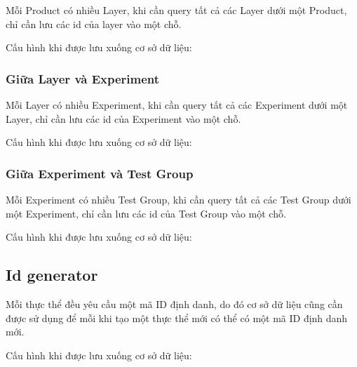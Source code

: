 Mỗi Product có nhiều Layer, khi cần query tất cả các Layer dưới một Product, chỉ cần lưu
các id của layer vào một chỗ.

Cấu hình khi được lưu xuống cơ sở dữ liệu:

\begin{itemize}
\end{itemize}

\subsubsection{Giữa Layer và Experiment}

Mỗi Layer có nhiều Experiment, khi cần query tất cả các Experiment dưới một Layer, chỉ cần lưu
các id của Experiment vào một chỗ.

Cấu hình khi được lưu xuống cơ sở dữ liệu:

\begin{itemize}
\end{itemize}

\subsubsection{Giữa Experiment và Test Group}

Mỗi Experiment có nhiều Test Group, khi cần query tất cả các Test Group dưới một Experiment, chỉ cần lưu
các id của Test Group vào một chỗ.

Cấu hình khi được lưu xuống cơ sở dữ liệu:

\begin{itemize}
\end{itemize}

\subsection{Id generator}

Mỗi thực thể đều yêu cầu một mã ID định danh, do đó cơ sở dữ liệu cũng cần được sử dụng để mỗi
khi tạo một thực thể mới có thể có một mã ID định danh mới.

Cấu hình khi được lưu xuống cơ sở dữ liệu:

\begin{itemize}
\end{itemize}
